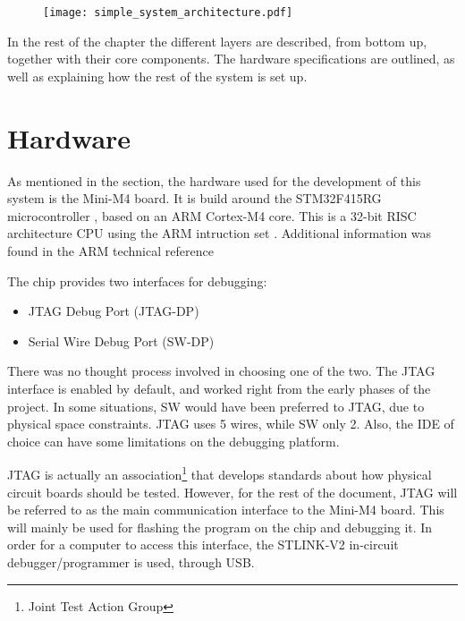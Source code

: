 \begin{figure}[H]
\centering
\texttt{[image: simple\_system\_architecture.pdf]}
\label{fig:simple_system}
\end{figure}

In the rest of the chapter the different layers are described,
from bottom up, 
together with their core components. The hardware specifications
are outlined, as well as explaining how the rest of the system is
set up.


\section{Hardware}

As mentioned in the  section,
the hardware used for the development of this system is the Mini-M4
board. It is build around the STM32F415RG microcontroller
\cite{stm32_datasheet}, based on
an ARM Cortex-M4 core. This is a 32-bit RISC architecture CPU using 
the ARM intruction set \cite{arm_architecture}. Additional information
was found in the ARM technical reference \cite{arm_technical} 

The chip provides two interfaces for debugging:
\begin{itemize}[noitemsep]
	\item JTAG Debug Port (JTAG-DP)
	\item Serial Wire Debug Port (SW-DP)
\end{itemize}
There was no thought process involved in choosing one of the two.
The JTAG interface is enabled by default, and worked right from the
early phases of the project. In some situations, SW would have been
preferred to JTAG, due to physical space constraints. JTAG uses 5
wires, while SW only 2. Also, the IDE of choice can have some limitations 
on the debugging platform.

JTAG is actually an association\footnote{Joint Test Action Group} 
that develops standards about how 
physical circuit boards should be tested. However, for the rest of
the document, JTAG will be referred to as the main communication interface
to the Mini-M4 board. This will mainly be used for flashing the program
on the chip and debugging it. In order for a computer to access this
interface, the STLINK-V2 in-circuit debugger/programmer \cite{st_link}
is used, through USB.

